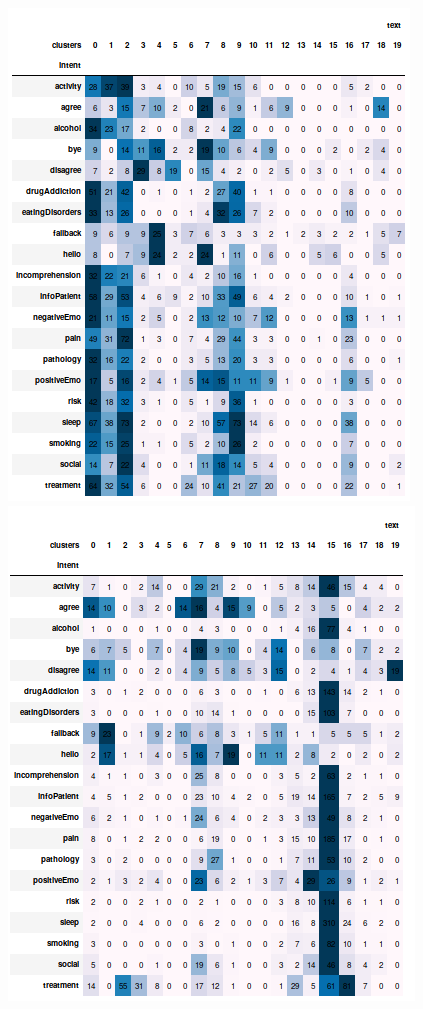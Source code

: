 \documentclass[11pt]{article}
\begin{document}
\begin{figure}[h]
	\centering
	\includegraphics[scale=0.28]{w2v100_ac.png}
	\includegraphics[scale=0.28]{w2v100_gm.png}

\end{figure}
\end{document}
